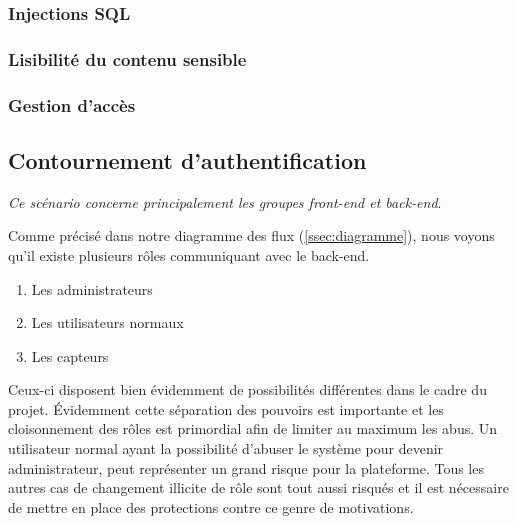 \documentclass[12pt]{article}
\begin{document}
\subsubsection{Injections SQL}

\subsubsection{Lisibilité du contenu sensible}

\subsubsection{Gestion d'accès}


\clearpage
\subsection{Contournement d'authentification}

\emph{Ce scénario concerne principalement les groupes front-end et back-end}. 
\medskip

Comme précisé dans notre diagramme des flux (\autoref{ssec:diagramme}), nous voyons qu'il existe plusieurs rôles communiquant avec le back-end. 

\begin{enumerate}
\item Les administrateurs
\item Les utilisateurs normaux
\item Les capteurs
\end{enumerate}

Ceux-ci disposent bien évidemment de possibilités différentes dans le cadre du projet. Évidemment cette séparation des pouvoirs est importante et les cloisonnement des rôles est primordial afin de limiter au maximum les abus. Un utilisateur normal ayant la possibilité d'abuser le système pour devenir administrateur, peut représenter un grand risque pour la plateforme. Tous les autres cas de changement illicite de rôle sont tout aussi risqués et il est nécessaire de mettre en place des protections contre ce genre de motivations.
\medskip
\end{document}
